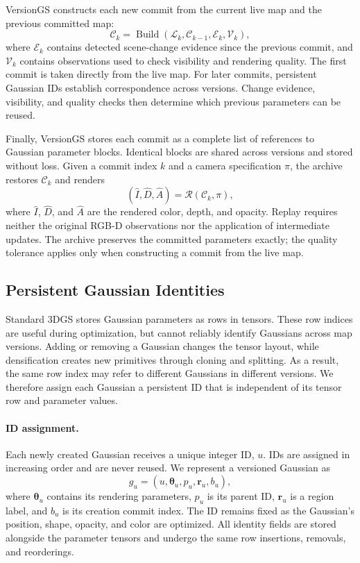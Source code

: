 VersionGS constructs each new commit from the current live map
and the previous committed map:
\begin{equation}
    \mathcal{C}_k =
    \operatorname{Build}
    (\mathcal{L}_k,\mathcal{C}_{k-1},\mathcal{E}_k,\mathcal{V}_k),
\end{equation}
where $\mathcal{E}_k$ contains detected scene-change evidence
since the previous commit, and $\mathcal{V}_k$ contains observations
used to check visibility and rendering quality.
The first commit is taken directly from the live map.
For later commits, persistent Gaussian IDs establish correspondence
across versions.
Change evidence, visibility, and quality checks then determine
which previous parameters can be reused.

Finally, VersionGS stores each commit as a complete list of references
to Gaussian parameter blocks.
Identical blocks are shared across versions and stored without loss.
Given a commit index $k$ and a camera specification $\pi$,
the archive restores $\mathcal{C}_k$ and renders
\begin{equation}
    (\hat{I},\hat{D},\hat{A})
    = \mathcal{R}(\mathcal{C}_k,\pi),
\end{equation}
where $\hat{I}$, $\hat{D}$, and $\hat{A}$ are the rendered color,
depth, and opacity.
Replay requires neither the original RGB-D observations nor
the application of intermediate updates.
The archive preserves the committed parameters exactly;
the quality tolerance applies only when constructing a commit
from the live map.

\subsection{Persistent Gaussian Identities}
\label{sec:gaussian_identities}

Standard 3DGS stores Gaussian parameters as rows in tensors.
These row indices are useful during optimization, but cannot reliably
identify Gaussians across map versions.
Adding or removing a Gaussian changes the tensor layout, while
densification creates new primitives through cloning and splitting.
As a result, the same row index may refer to different Gaussians
in different versions.
We therefore assign each Gaussian a persistent ID that is independent
of its tensor row and parameter values.

\paragraph{ID assignment.}
Each newly created Gaussian receives a unique integer ID, $u$.
IDs are assigned in increasing order and are never reused.
We represent a versioned Gaussian as
\begin{equation}
    g_u =
    (u,\boldsymbol{\theta}_u,p_u,\boldsymbol{r}_u,b_u),
\end{equation}
where $\boldsymbol{\theta}_u$ contains its rendering parameters,
$p_u$ is its parent ID, $\boldsymbol{r}_u$ is a region label,
and $b_u$ is its creation commit index.
The ID remains fixed as the Gaussian's position, shape, opacity,
and color are optimized.
All identity fields are stored alongside the parameter tensors
and undergo the same row insertions, removals, and reorderings.

